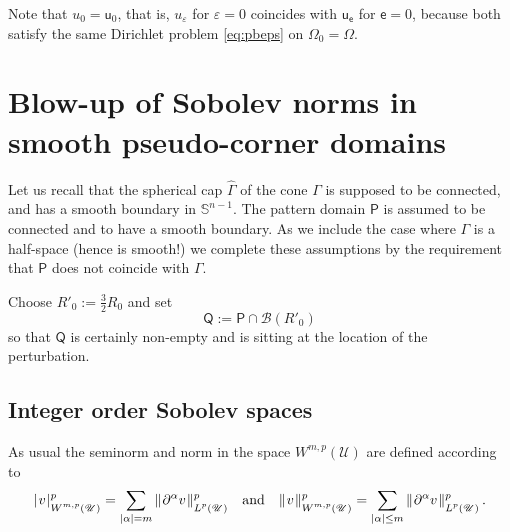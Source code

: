 \documentclass[titlepage,12pt]{amsart}
\theoremstyle{definition}
\theoremstyle{remark}
\numberwithin{equation}{section}
\newcommand{\ee}{\hskip0.15ex}
\newcommand{\dd}[1]{_{\raise-0.6ex\hbox{$\scriptstyle #1$}}}
\newcommand {\Normc}[3]{ \mathchoice
    {|\ee #1\ee|\dd{#2}^{#3}}
    {| #1 |_{#2}^{#3}}
    {| #1 |_{#2}^{#3}}
    {| #1 |_{#2}^{#3}} }
\newcommand {\DNormc}[3]{ \mathchoice
    {\|\ee #1\ee\|\dd{#2}^{#3}}
    {\| #1 \|_{#2}^{#3}}
    {\| #1 \|_{#2}^{#3}}
    {\| #1 \|_{#2}^{#3}} }
\newcommand\bS{{\mathbb S}}
\newcommand{\sB}{{\mathscr B}}
\newcommand{\sU}{{\mathscr U}}
\newcommand\cU{{\mathcal{U}}}
\newcommand{\rP}{{\mathsf{P}}}
\newcommand{\rQ}{{\mathsf{Q}}}
\newcommand{\sfe}{{\mathsf e}}
\newcommand{\sfu}{{\mathsf u}}
\begin{document}
Note that $u_{0}=\sfu_{0}$, that is, $u_{\varepsilon}$ for $\varepsilon=0$ coincides with $\sfu_{\sfe}$ for $\sfe=0$, because both satisfy the same Dirichlet problem \eqref{eq:pbeps} on $\Omega_{0}=\Omega$.



\section{Blow-up of Sobolev norms in smooth pseudo-corner domains}
\label{S:smoothpseudo}

Let us recall that the spherical cap $\widehat\Gamma$ of the cone $\Gamma$ is supposed to be connected, and has a smooth boundary in $\bS^{n-1}$. The pattern domain $\rP$ is assumed to be connected and to have a smooth boundary. As we include the case where $\Gamma$ is a half-space (hence is smooth!) we complete these assumptions by the requirement that $\rP$ does not coincide with $\Gamma$. 

Choose $R'_0:=\frac{3}{2}R_0$ and set
\begin{equation}
\label{eq:Q}
   \rQ := \rP\cap\sB(R'_0)
\end{equation}
so that $\rQ$ is certainly non-empty and is sitting at the location of the perturbation.

\subsection{Integer order Sobolev spaces}
As usual the seminorm and norm in the space $W^{m,p}(\cU)$ are defined according to
\[
   \Normc{v}{W^{m,p}(\sU)}{p} = \sum_{|\alpha|=m} \DNormc{\partial^\alpha v}{L^p(\sU)}{p}
   \quad\mbox{and}\quad
   \DNormc{v}{W^{m,p}(\sU)}{p} = \sum_{|\alpha|\le m} \DNormc{\partial^\alpha v}{L^p(\sU)}{p}\,.
\]
\end{document}
